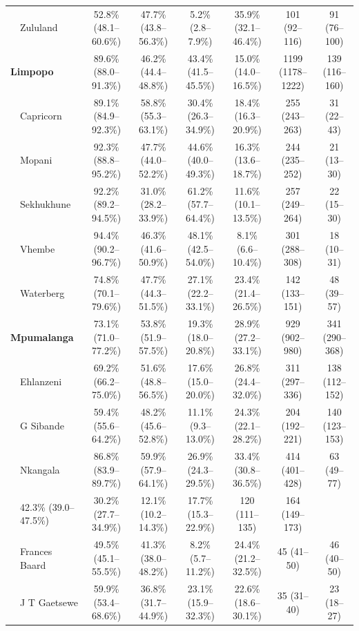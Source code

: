 \documentclass{article}
\begin{document}
\begin{landscape}
{\begin{longtable}[c]{llc cc ccc}
      & Zululand & 52.8\% (48.1--60.6\%) & 47.7\% (43.8--56.3\%) & 5.2\% (2.8--7.9\%) & 35.9\% (32.1--46.4\%) & 101 (92--116) & 91 (76--100) \\[5pt]
      \multicolumn{2}{l}{\textbf{Limpopo}} & 89.6\% (88.0--91.3\%) & 46.2\% (44.4--48.8\%) & 43.4\% (41.5--45.5\%) & 15.0\% (14.0--16.5\%) & 1199 (1178--1222) & 139 (116--160) \\
      & Capricorn & 89.1\% (84.9--92.3\%) & 58.8\% (55.3--63.1\%) & 30.4\% (26.3--34.9\%) & 18.4\% (16.3--20.9\%) & 255 (243--263) & 31 (22--43) \\
      & Mopani & 92.3\% (88.8--95.2\%) & 47.7\% (44.0--52.2\%) & 44.6\% (40.0--49.3\%) & 16.3\% (13.6--18.7\%) & 244 (235--252) & 21 (13--30) \\
      & Sekhukhune & 92.2\% (89.2--94.5\%) & 31.0\% (28.2--33.9\%) & 61.2\% (57.7--64.4\%) & 11.6\% (10.1--13.5\%) & 257 (249--264) & 22 (15--30) \\
      & Vhembe & 94.4\% (90.2--96.7\%) & 46.3\% (41.6--50.9\%) & 48.1\% (42.5--54.0\%) & 8.1\% (6.6--10.4\%) & 301 (288--308) & 18 (10--31) \\
      & Waterberg & 74.8\% (70.1--79.6\%) & 47.7\% (44.3--51.5\%) & 27.1\% (22.2--33.1\%) & 23.4\% (21.4--26.5\%) & 142 (133--151) & 48 (39--57) \\[5pt]
      \multicolumn{2}{l}{\textbf{Mpumalanga}} & 73.1\% (71.0--77.2\%) & 53.8\% (51.9--57.5\%) & 19.3\% (18.0--20.8\%) & 28.9\% (27.2--33.1\%) & 929 (902--980) & 341 (290--368) \\
      & Ehlanzeni & 69.2\% (66.2--75.0\%) & 51.6\% (48.8--56.5\%) & 17.6\% (15.0--20.0\%) & 26.8\% (24.4--32.0\%) & 311 (297--336) & 138 (112--152) \\
      & G Sibande & 59.4\% (55.6--64.2\%) & 48.2\% (45.6--52.8\%) & 11.1\% (9.3--13.0\%) & 24.3\% (22.1--28.2\%) & 204 (192--221) & 140 (123--153) \\
      & Nkangala & 86.8\% (83.9--89.7\%) & 59.9\% (57.9--64.1\%) & 26.9\% (24.3--29.5\%) & 33.4\% (30.8--36.5\%) & 414 (401--428) & 63 (49--77) \\
      \pagebreak
      \multicolumn{2}{l}{\textbf{Northern Cape}} & 42.3\% (39.0--47.5\%) & 30.2\% (27.7--34.9\%) & 12.1\% (10.2--14.3\%) & 17.7\% (15.3--22.9\%) & 120 (111--135) & 164 (149--173) \\
      & Frances Baard & 49.5\% (45.1--55.5\%) & 41.3\% (38.0--48.2\%) & 8.2\% (5.7--11.2\%) & 24.4\% (21.2--32.5\%) & 45 (41--50) & 46 (40--50) \\
      & J T Gaetsewe & 59.9\% (53.4--68.6\%) & 36.8\% (31.7--44.9\%) & 23.1\% (15.9--32.3\%) & 22.6\% (18.6--30.1\%) & 35 (31--40) & 23 (18--27) \\

\end{longtable}}
\end{landscape}
\end{document}
